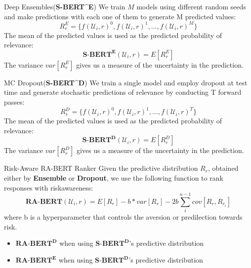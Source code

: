\documentclass{beamer}
\begin{document}
\begin{frame}{Deep Ensembles(\textbf{S-BERT}^{\textbf{E}})}
We train $M$ models using different random seeds and make predictions with each one of them to generate M predicted values:
\begin{equation}
    R^{E}_{r} = \{ f(\mathcal{U}_i, r)^0, f(\mathcal{U}_i, r)^1, ..., f(\mathcal{U}_i, r)^M \}
\end{equation}
The mean of the predicted values is used as the predicted probability of relevance:
\begin{equation}
    \textbf{S-BERT}^{\textbf{E}}(\mathcal{U}_i, r) = E[R^E_r]
\end{equation}
The variance $var[R^E_r]$ gives us a measure of the uncertainty in the prediction.
\end{frame}

\begin{frame}{MC Dropout(\textbf{S-BERT}^{\textbf{D}})}
We train a single model and employ dropout at test time and generate stochastic predictions of relevance by conducting T forward passes:
\begin{equation}
    R^{D}_{r} = \{ f(\mathcal{U}_i, r)^0, f(\mathcal{U}_i, r)^1, ..., f(\mathcal{U}_i, r)^T \}
\end{equation}
The mean of the predicted values is used as the predicted probability of relevance:
\begin{equation}
    \textbf{S-BERT}^{\textbf{D}}(\mathcal{U}_i, r) = E[R^D_r]
\end{equation}
The variance $var[R^D_r]$ gives us a measure of the uncertainty in the prediction.

\end{frame}

\begin{frame}{Risk-Aware RA-BERT Ranker}
    Given the predictive distribution $R_r$, obtained either by \textbf{Ensemble} or \textbf{Dropout}, we use the following function to rank responses with riskawareness:
    \begin{equation}
        \textbf{RA-BERT}(\mathcal{U}_i, r) = E[R_r] - b * var[R_r] - 2b\sum_i^{n-1}cov[R_r, R_{r_i}]
    \end{equation}
    where b is a hyperparameter that controls the aversion or predilection towards risk.
    
    \begin{itemize}
        \item $\textbf{RA-BERT}^\textbf{D} $ when using $\textbf{S-BERT}^\textbf{D}$'s predictive distribution
        \item $\textbf{RA-BERT}^\textbf{E} $ when using $\textbf{S-BERT}^\textbf{D}$'s predictive distribution
    \end{itemize}
\end{frame}
\end{document}

